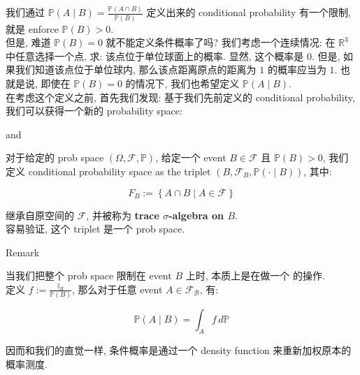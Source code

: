 我们通过 \(\mathbb{P}(\mathit{A} \mid \mathit{B}) = \frac{\mathbb{P}(\mathit{A} \cap \mathit{B})}{\mathbb{P}(\mathit{B})}\) 定义出来的 conditional probability 有一个限制, 就是 enforce \(\mathbb{P}(\mathit{B}) > 0\).\\
但是, 难道 \(\mathbb{P}(\mathit{B}) = 0\) 就不能定义条件概率了吗? 我们考虑一个连续情况: 在 \(\mathbb{R}^{3}\) 中任意选择一个点, 求: 该点位于单位球面上的概率. 显然, 这个概率是 0. 但是, 如果我们知道该点位于单位球内, 那么该点距离原点的距离为 \(1\) 的概率应当为 \(1\). 也就是说, 即使在 \(\mathbb{P}(\mathit{B}) = 0\) 的情况下, 我们也希望定义 \(\mathbb{P}(\mathit{A} \mid \mathit{B})\).\\
在考虑这个定义之前, 首先我们发现: 基于我们先前定义的 conditional probability, 我们可以获得一个新的 probability space:

\begin{definition}{ and
}

对于给定的 prob space \((\Omega,\mathcal{F},\mathbb{P})\), 给定一个 event \(\mathit{B} \in \mathcal{F}\) 且 \(\mathbb{P}(\mathit{B}) > 0\), 我们定义 conditional probability space as the triplet \((\mathit{B},\mathcal{F}_{\mathit{B}},\mathbb{P}( \cdot \mid \mathit{B}))\), 其中:

\[\mathit{F}_{\mathit{B}} := \left\{ {\mathit{A} \cap \mathit{B} \mid \mathit{A} \in \mathcal{F}} \right\}\]

继承自原空间的  \(\mathcal{F}\), 并被称为 \textbf{trace \(\mathit{\sigma}\)-algebra on \(\mathit{B}\)}.\\
容易验证, 这个 triplet 是一个 prob space.

\end{definition}

\begin{qlremark}{Remark}

当我们把整个 prob space 限制在 event \(\mathit{B}\) 上时, 本质上是在做一个  的操作.\\
定义 \(\mathit{f} := \frac{\mathbb{I}_{\mathit{B}}}{\mathbb{P}(\mathit{B})}\), 那么对于任意 event \(\mathit{A} \in \mathcal{F}_{\mathcal{B}}\), 有:

\[\mathbb{P}(\mathit{A} \mid \mathit{B}) = \int_{\mathit{A}}\mathit{f}\,\mathit{d}\mathbb{P}\]

因而和我们的直觉一样, 条件概率是通过一个 density function 来重新加权原本的概率测度.

\end{qlremark}

